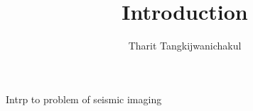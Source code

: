 \title{Introduction}
\author{Tharit Tangkijwanichakul}
\label{ch:chapter-intro}

Intrp to problem of seismic imaging

\maketitle


 